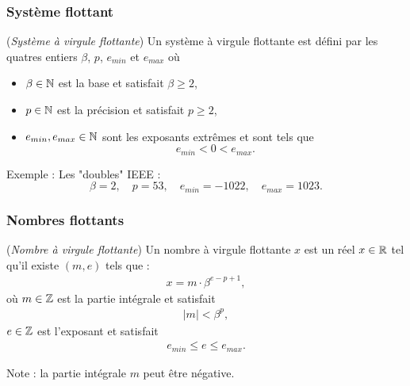 \documentclass{beamer}
\begin{document}

\begin{frame}
\frametitle{Système flottant}

\begin{definition}
(\emph{Système à virgule flottante})
Un système à virgule flottante est défini par les quatres entiers 
$\beta$, $p$, $e_{min}$ et $e_{max}$ où 
\begin{itemize}
\item $\beta\in\mathbb{N}$ est la base et satisfait $\beta\geq 2$,
\item $p\in\mathbb{N}$ est la précision et satisfait $p\geq 2$,
\item $e_{min},e_{max}\in\mathbb{N}$ sont les exposants extrêmes et sont tels que
$$
e_{min} < 0 < e_{max}.
$$
\end{itemize}
\end{definition}

\begin{example}
Exemple : Les "doubles" IEEE :
$$
\beta=2, \quad p=53, \quad e_{min} = -1022, \quad e_{max} = 1023.
$$
\end{example}

\end{frame}



\begin{frame}
\frametitle{Nombres flottants}

\begin{definition}
(\emph{Nombre à virgule flottante})
Un nombre à virgule flottante $x$ est un réel $x\in\mathbb{R}$ tel qu'il 
existe $(m,e)$ tels que :
\begin{eqnarray}
x = m \cdot \beta^{e-p+1},
\end{eqnarray}
où 
$m\in\mathbb{Z}$ est la partie intégrale et satisfait 
\begin{eqnarray}
|m| < \beta^p,
\end{eqnarray}
$e\in\mathbb{Z}$ est l'exposant et satisfait 
\begin{eqnarray}
e_{min} \leq e \leq e_{max}.
\end{eqnarray}
\end{definition}

Note : la partie intégrale $m$ peut être négative.

\end{frame}
\end{document}
